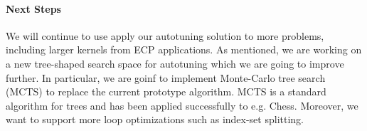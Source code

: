 \paragraph{Next Steps}

We will continue to use apply our autotuning solution to more problems, including larger kernels from ECP applications. 
As mentioned, we are working on a new tree-shaped search space for autotuning which we are going to improve further. In particular, we are goinf to implement Monte-Carlo tree search (MCTS) to replace the current prototype algorithm. MCTS is a standard algorithm for trees and has been applied successfully to e.g. Chess. Moreover, we want to support more loop optimizations such as index-set splitting.
